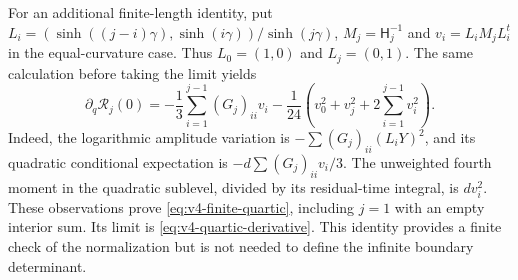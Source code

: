 For an additional finite-length identity, put
$L_i=(\sinh((j-i)\gamma),\sinh(i\gamma))/\sinh(j\gamma)$,
$M_j=\mathsf H_j^{-1}$ and $v_i=L_i M_jL_i^t$ in the equal-curvature
case. Thus $L_0=(1,0)$ and $L_j=(0,1)$. The same calculation before
taking the limit yields
\begin{equation}\label{eq:v4-finite-quartic}
 \partial_q\mathcal R_j(0)=
 -\frac13\sum_{i=1}^{j-1}(G_j)_{ii}v_i
 -\frac1{24}\left(v_0^2+v_j^2+2\sum_{i=1}^{j-1}v_i^2\right).
\end{equation}
Indeed, the logarithmic amplitude variation is
$-\sum(G_j)_{ii}(L_iY)^2$, and its quadratic conditional expectation
is $-d\sum(G_j)_{ii}v_i/3$. The unweighted fourth moment in the
quadratic sublevel, divided by its residual-time integral, is
$d v_i^2$. These observations prove \eqref{eq:v4-finite-quartic},
including $j=1$ with an empty interior sum. Its limit is
\eqref{eq:v4-quartic-derivative}. This identity provides a finite
check of the normalization but is not needed to define the infinite
boundary determinant.

